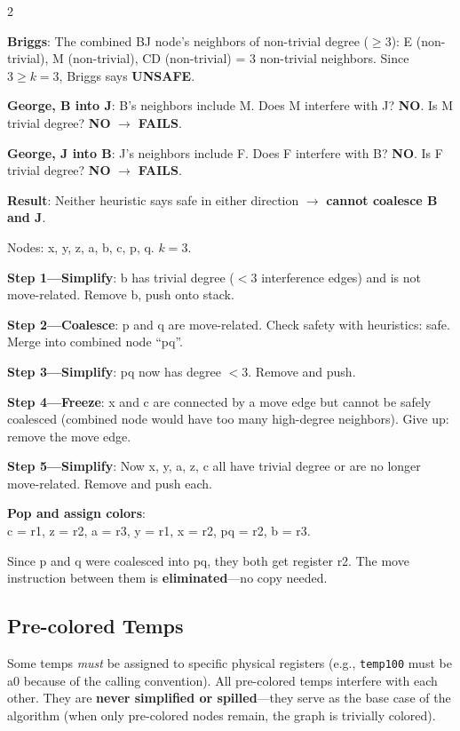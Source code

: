 \documentclass[9pt,landscape]{extarticle}
\begin{document}
\begin{multicols}{2}
\begin{exambox}
\textbf{Briggs}: The combined BJ node's neighbors of non-trivial degree ($\geq 3$): E (non-trivial), M (non-trivial), CD (non-trivial) = 3 non-trivial neighbors. Since $3 \geq k = 3$, Briggs says \textbf{UNSAFE}.

\textbf{George, B into J}: B's neighbors include M. Does M interfere with J? \textbf{NO}. Is M trivial degree? \textbf{NO} $\to$ \textbf{FAILS}.

\textbf{George, J into B}: J's neighbors include F. Does F interfere with B? \textbf{NO}. Is F trivial degree? \textbf{NO} $\to$ \textbf{FAILS}.

\textbf{Result}: Neither heuristic says safe in either direction $\to$ \textbf{cannot coalesce B and J}.
\end{exambox}

\begin{exambox}
Nodes: x, y, z, a, b, c, p, q. $k = 3$.

\textbf{Step 1---Simplify}: b has trivial degree ($< 3$ interference edges) and is not move-related. Remove b, push onto stack.

\textbf{Step 2---Coalesce}: p and q are move-related. Check safety with heuristics: safe. Merge into combined node ``pq''.

\textbf{Step 3---Simplify}: pq now has degree $< 3$. Remove and push.

\textbf{Step 4---Freeze}: x and c are connected by a move edge but cannot be safely coalesced (combined node would have too many high-degree neighbors). Give up: remove the move edge.

\textbf{Step 5---Simplify}: Now x, y, a, z, c all have trivial degree or are no longer move-related. Remove and push each.

\textbf{Pop and assign colors}:\\
c = r1, z = r2, a = r3, y = r1, x = r2, pq = r2, b = r3.

Since p and q were coalesced into pq, they both get register r2. The move instruction between them is \textbf{eliminated}---no copy needed.
\end{exambox}

\subsection{Pre-colored Temps}

Some temps \emph{must} be assigned to specific physical registers (e.g., \texttt{temp100} must be a0 because of the calling convention). All pre-colored temps interfere with each other. They are \textbf{never simplified or spilled}---they serve as the base case of the algorithm (when only pre-colored nodes remain, the graph is trivially colored).


\end{multicols}
\end{document}
